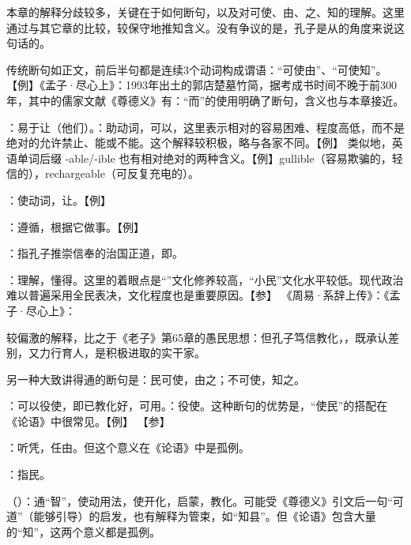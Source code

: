 {
本章的解释分歧较多，关键在于如何断句，以及对可使、由、之、知的理解。这里通过与其它章的比较，较保守地推知含义。没有争议的是，孔子是从的角度来说这句话的。

传统断句如正文，前后半句都是连续3个动词构成谓语：“可使由”、“可使知”。【例】《孟子·尽心上》：1993年出土的郭店楚墓竹简，据考成书时间不晚于前300年，其中的儒家文献《尊德义》有：“而”的使用明确了断句，含义也与本章接近。
\begin{lyitemize}
\item {}：易于让（他们）。：助动词，可以，这里表示相对的容易困难、程度高低，而不是绝对的允许禁止、能或不能。这个解释较积极，略与各家不同。【例】 类似地，英语单词后缀 -able/-ible 也有相对绝对的两种含义。【例】gullible（容易欺骗的，轻信的），rechargeable（可反复充电的）。

：使动词，让。【例】  %
\item {}：遵循，根据它做事。【例】 
\item {}：指孔子推崇信奉的治国正道，即。
\item {}：理解，懂得。这里的着眼点是“”文化修养较高，“小民”文化水平较低。现代政治难以普遍采用全民表决，文化程度也是重要原因。【参】   《周易·系辞上传》：《孟子·尽心上》：

较偏激的解释，比之于《老子》第65章的愚民思想：但孔子笃信教化，，既承认差别，又力行育人，是积极进取的实干家。
\end{lyitemize}

另一种大致讲得通的断句是：民可使，由之；不可使，知之。
\begin{lyitemize}
\item {}：可以役使，即已教化好，可用。：役使。这种断句的优势是，“使民”的搭配在《论语》中很常见。【例】     【参】
\item {}：听凭，任由。但这个意义在《论语》中是孤例。%
\item {}：指民。
\item {}（）：通“智”，使动用法，使开化，启蒙，教化。可能受《尊德义》引文后一句“可道”（能够引导）的启发，也有解释为管束，如“知县”。但《论语》包含大量的“知”，这两个意义都是孤例。
\end{lyitemize}

}
